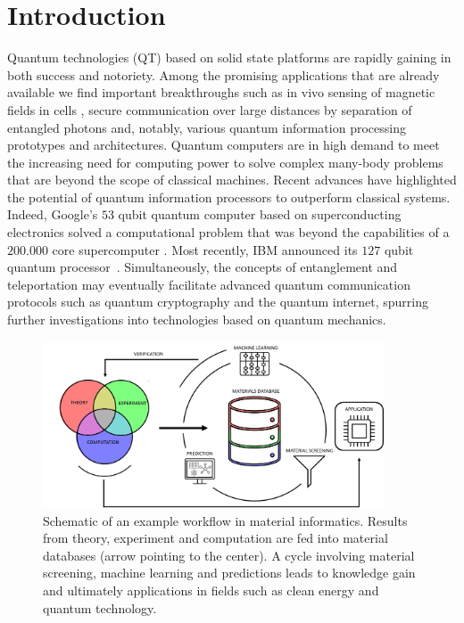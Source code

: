 \documentclass[superscriptaddress,unsortedaddress,
 amsmath,amssymb,
 aps,
]{revtex4-2}
\begin{document}
\section*{Introduction}
Quantum technologies (QT) based on solid state platforms are rapidly gaining in both success and notoriety. 
Among the promising applications that are already available we find important breakthroughs  such as in vivo sensing of magnetic fields in cells \cite{Lesage_2013}, secure communication over large distances by separation of entangled photons \cite{Ursin2007} and, notably, various quantum information processing prototypes and architectures.  
Quantum computers are in high demand to meet the increasing need for computing power to solve complex many-body problems that are beyond the scope of classical machines.   
Recent advances have highlighted the potential of quantum information processors to outperform classical systems. Indeed, Google's $53$ qubit quantum computer based on superconducting electronics solved a computational problem that was beyond the capabilities of a $200.000$ core supercomputer \cite{Arute_2019}. Most recently, IBM announced its $127$ qubit quantum processor~\cite{IBM2021}. Simultaneously, the concepts of entanglement and teleportation may eventually facilitate advanced quantum communication protocols such as quantum cryptography and the quantum internet, spurring further investigations into technologies based on quantum mechanics.

\begin{figure}[t]
    \centering
    \includegraphics[width=0.9\textwidth]{figures/ht-workflow-new-2.png}
    \caption{Schematic of an example workflow in material informatics. Results from theory, experiment and computation are fed into material databases (arrow pointing to the center). A cycle involving material screening, machine learning and predictions leads to knowledge gain and ultimately applications in fields such as clean energy and quantum technology. 
    }
    \label{fig:ht-workflow}
\end{figure}
\end{document}
